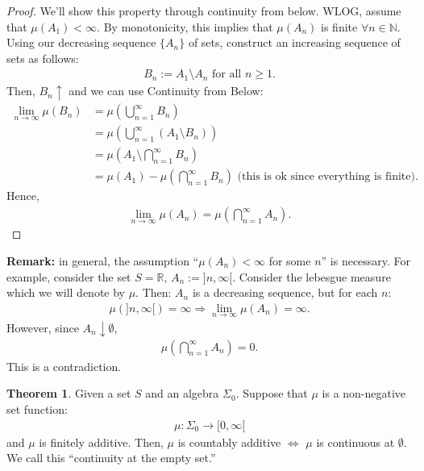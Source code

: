 \documentclass[11pt]{article}
\theoremstyle{definition}
\theoremstyle{theorem}
\newtheorem{thm}{Theorem}[section]
\newcommand{\R}[0]{\mathbb{R}}
\newcommand{\N}[0]{\mathbb{N}}
\begin{document}
\begin{proof}
	We'll show this property through continuity from below. WLOG, assume that \( \mu (A_1 ) < \infty \). By monotonicity, this implies that \( \mu(A_n) \) is finite \( \forall n \in \N \). Using our decreasing sequence \( \{ A_n \} \) of sets, construct an increasing sequence of sets as follows: 
	\begin{align*}
		B_n := A_1 \setminus A_n \text{ for all } n \geq 1.	
	\end{align*}
	Then, \( B_n \uparrow \) and we can use Continuity from Below:
	\begin{align*}
		\lim_{n \rightarrow \infty} \mu (B_n)  & = \mu \left( \bigcup_{n=1}^\infty B_n \right) \\
		& = \mu \left( \bigcup_{n=1}^\infty ( A_1 \setminus B_n) \right) \\
		& = \mu \left( A_1 \setminus \bigcap_{n=1}^\infty B_n  \right) \\
		& = \mu(A_1) - \mu \left( \bigcap_{n=1}^\infty B_n \right) \text{ (this is ok since everything is finite).}  
	\end{align*}
	Hence, 
	\begin{align*}
		\lim_{n \rightarrow \infty} \mu(A_n) = \mu \left( \bigcap_{n=1}^\infty A_n \right).	
	\end{align*}
\end{proof}
\textbf{Remark:} in general, the assumption ``\( \mu(A_n) < \infty \) for some \( n \)'' is necessary. For example, consider the set \( S = \R \), \( A_n := ]n, \infty[ \). Consider the lebesgue measure which we will denote by \( \mu \). Then: \( A_n \) is a decreasing sequence, but for each \( n \): 
\begin{align*}
	\mu ( ]n, \infty [ ) = \infty \Rightarrow \lim_{n \rightarrow \infty} \mu (A_n) = \infty. 	
\end{align*}
However, since \( A_n \downarrow \emptyset \), 
\begin{align*}
	\mu \left( \bigcap_{n=1}^\infty A_n \right) = 0.
\end{align*}
This is a contradiction.

\begin{thm}
	Given a set \( S \) and an algebra \( \Sigma_0 \). Suppose that \( \mu \) is a non-negative set function: 
	\begin{align*}
		\mu: \Sigma_0 \rightarrow [0, \infty [	
	\end{align*}
	and \( \mu \) is finitely additive. Then, \( \mu \) is countably additive \( \iff \) \( \mu \) is continuous at \( \emptyset \). We call this ``continuity at the empty set.'' 
\end{thm}
\end{document}
